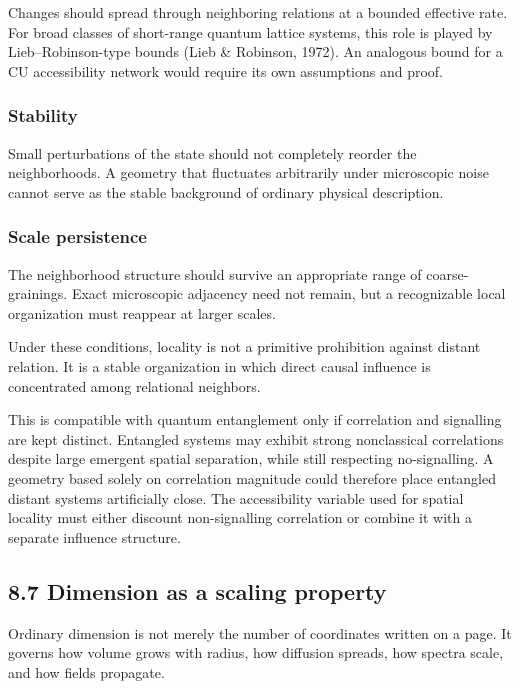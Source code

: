 \documentclass[
  11pt,
]{article}
\begin{document}
Changes should spread through neighboring relations at a bounded
effective rate. For broad classes of short-range quantum lattice
systems, this role is played by Lieb--Robinson-type bounds (Lieb \&
Robinson, 1972). An analogous bound for a CU accessibility network would
require its own assumptions and proof.

\subsubsection{Stability}\label{stability}

Small perturbations of the state should not completely reorder the
neighborhoods. A geometry that fluctuates arbitrarily under microscopic
noise cannot serve as the stable background of ordinary physical
description.

\subsubsection{Scale persistence}\label{scale-persistence}

The neighborhood structure should survive an appropriate range of
coarse-grainings. Exact microscopic adjacency need not remain, but a
recognizable local organization must reappear at larger scales.

Under these conditions, locality is not a primitive prohibition against
distant relation. It is a stable organization in which direct causal
influence is concentrated among relational neighbors.

This is compatible with quantum entanglement only if correlation and
signalling are kept distinct. Entangled systems may exhibit strong
nonclassical correlations despite large emergent spatial separation,
while still respecting no-signalling. A geometry based solely on
correlation magnitude could therefore place entangled distant systems
artificially close. The accessibility variable used for spatial locality
must either discount non-signalling correlation or combine it with a
separate influence structure.

\subsection{8.7 Dimension as a scaling
property}\label{dimension-as-a-scaling-property}

Ordinary dimension is not merely the number of coordinates written on a
page. It governs how volume grows with radius, how diffusion spreads,
how spectra scale, and how fields propagate.
\end{document}
